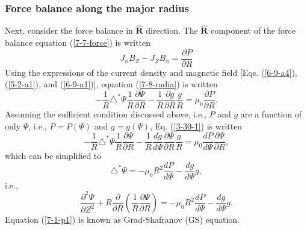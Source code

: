\documentclass{llncs}
\begin{document}
\subsubsection{Force balance along the major radius}

Next, consider the force balance in $\hat{\mathbf{R}}$ direction. The
$\hat{\mathbf{R}}$ component of the force balance equation (\ref{7-7-force})
is written
\begin{equation}
  \label{7-8-radia} J_{\phi} B_Z - J_Z B_{\phi} = \frac{\partial P}{\partial
  R}
\end{equation}
Using the expressions of the current density and magnetic field [Eqs.
(\ref{6-9-a4}), (\ref{5-2-a1}), and (\ref{6-9-a1})], equation
(\ref{7-8-radia}) is written
\begin{equation}
  \label{3-30-1} - \frac{1}{R} \triangle^{\ast} \Psi \frac{1}{R}
  \frac{\partial \Psi}{\partial R} - \frac{1}{R} \frac{\partial g}{\partial R}
  \frac{g}{R} = \mu_0 \frac{\partial P}{\partial R} .
\end{equation}
Assuming the sufficient condition discussed above, i.e., $P$ and $g$ are a
function of only $\Psi$, i.e., $P = P (\Psi)$ and $g = g (\Psi)$, Eq.
(\ref{3-30-1}) is written
\begin{equation}
  - \frac{1}{R} \triangle^{\ast} \Psi \frac{1}{R} \frac{\partial
  \Psi}{\partial R} - \frac{1}{R} \frac{d g}{d \Psi} \frac{\partial
  \Psi}{\partial R}  \frac{g}{R} = \mu_0 \frac{d P}{d \Psi} \frac{\partial
  \Psi}{\partial R},
\end{equation}
which can be simplified to
\begin{equation}
  \triangle^{\ast} \Psi = - \mu_0 R^2 \frac{d P}{d \Psi} - \frac{d g}{d \Psi}
  g,
\end{equation}
i.e.,
\begin{equation}
  \label{7-1-p1} \frac{\partial^2 \Psi}{\partial Z^2} + R
  \frac{\partial}{\partial R} \left( \frac{1}{R} \frac{\partial \Psi}{\partial
  R} \right) = - \mu_0 R^2 \frac{d P}{d \Psi} - \frac{d g}{d \Psi} g.
\end{equation}
Equation (\ref{7-1-p1}) is known as Grad-Shafranov (GS) equation.
\end{document}
